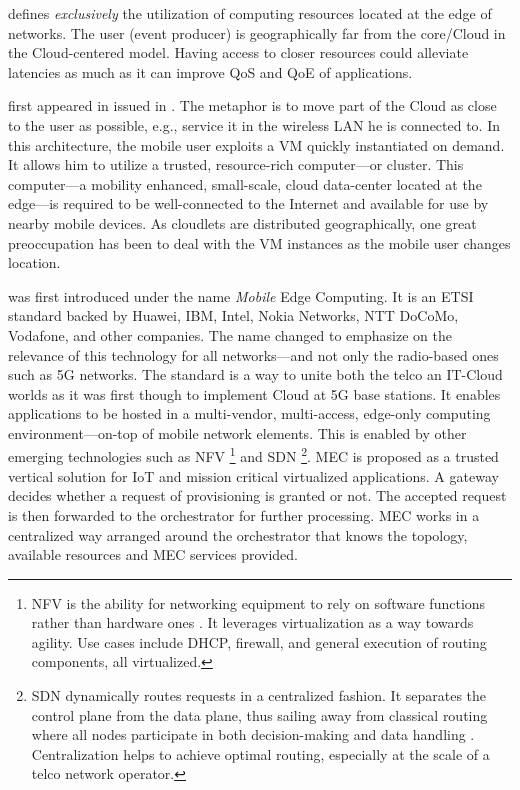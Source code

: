 \begin{description}[leftmargin=10pt]
	\item[Edge Computing] defines \emph{exclusively} the utilization of computing resources located at the edge of networks. The user (event producer) is geographically far from the core/Cloud in the Cloud-centered model. Having access to closer resources could alleviate latencies as much as it can improve \gls{QoS} and \gls{QoE} of applications.

	\item[Cloudlets] first appeared in \cite{satyanarayanan_case_2009} issued in . The metaphor is to move part of the Cloud as close to the user as possible, e.g., service it in the wireless LAN he is connected to. In this architecture, the mobile user exploits a \gls{VM} quickly instantiated on demand. It allows him to utilize a trusted, resource-rich computer—or cluster. This computer—a mobility enhanced, small-scale, cloud data-center located at the edge—is required to be well-connected to the Internet and available for use by nearby mobile devices. As cloudlets are distributed geographically, one great preoccupation has been to deal with the \gls{VM} instances as the mobile user changes location.

	\item[\acrfull{MEC}] was first introduced under the name \emph{Mobile} Edge Computing. It is an \gls{ETSI} standard backed by Huawei, IBM, Intel, Nokia Networks, NTT DoCoMo, Vodafone, and other companies. The name changed to emphasize on the relevance of this technology for all networks—and not only the radio-based ones such as 5G networks. The standard is a way to unite both the telco an IT-Cloud worlds \cite{dahmen-lhuissier_etsi_nodate-1} as it was first though to implement Cloud at 5G base stations. It enables applications to be hosted in a multi-vendor, multi-access, edge-only computing environment—on-top of mobile network elements. This is enabled by other emerging technologies such as \gls{NFV} \footnote{\acrfull{NFV} is the ability for networking equipment to rely on software functions rather than hardware ones \cite{redhat_what_2019}. It leverages virtualization as a way towards agility. Use cases include DHCP, firewall, and general execution of routing components, all virtualized.} and \gls{SDN} \footnote{\acrfull{SDN} dynamically routes requests in a centralized fashion. It separates the control plane from the data plane, thus sailing away from classical routing where all nodes participate in both decision-making and data handling \cite{redhat_what_2019}. Centralization helps to achieve optimal routing, especially at the scale of a telco network operator.}. \gls{MEC} is proposed as a trusted vertical solution for \gls{IoT} and mission critical virtualized applications.
		A gateway decides whether a request of provisioning is granted or not. The accepted request is then forwarded to the orchestrator for further processing. \gls{MEC} works in a centralized way arranged around the orchestrator that knows the topology, available resources and \gls{MEC} services provided.


\end{description}
